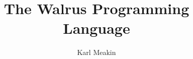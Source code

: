 \documentclass[12pt]{third-rep}
\title{The Walrus Programming Language}
\author{Karl Meakin}
\begin{document}
\dotitleandabstract

\tableofcontents
\listoffigures
\listoftables






% 
% 

\appendix



\end{document}

